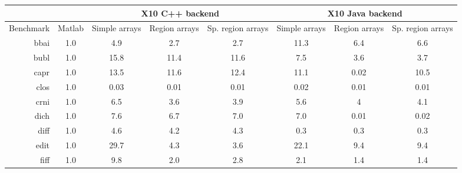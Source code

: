 \begin{tabular}{|r|c|ccc|ccc|}
\hline
           &        & \multicolumn{3}{c|}{X10 C++ backend}                   &
\multicolumn{3}{c|}{X10 Java backend}                  \\ \hline
Benchmark  & Matlab & Simple arrays & Region arrays & Sp. region arrays &
Simple arrays & Region arrays & Sp. region arrays \\ \hline
bbai           & 1.0     & 4.9                    & 2.7                     & 2.7                             & 11.3                         & 6.4                      & 6.6                              \\
bubl           & 1.0     & 15.8                   & 11.4                    & 11.6                            & 7.5                          & 3.6                      & 3.7                              \\
capr           & 1.0     & 13.5                   & 11.6                    & 12.4                            & 11.1                         & 0.02                        & 10.5                             \\
clos           & 1.0     & 0.03                   & 0.01                    & 0.01                               & 0.02                         & 0.01                     & 0.01                             \\
crni           & 1.0     & 6.5                    & 3.6                     & 3.9                             & 5.6                          & 4                        & 4.1                              \\
dich           & 1.0     & 7.6                    & 6.7                     & 7.0                               & 7.0                            & 0.01                        & 0.02                                \\
diff           & 1.0     & 4.6                    & 4.2                     & 4.3                             & 0.3                          & 0.3                      & 0.3                              \\
edit           & 1.0     & 29.7                   & 4.3                     & 3.6                             & 22.1                         & 9.4                      & 9.4                              \\
fiff           & 1.0     & 9.8                    & 2.0                       & 2.8                             & 2.1                          & 1.4                      & 1.4                              \\

\end{tabular}
